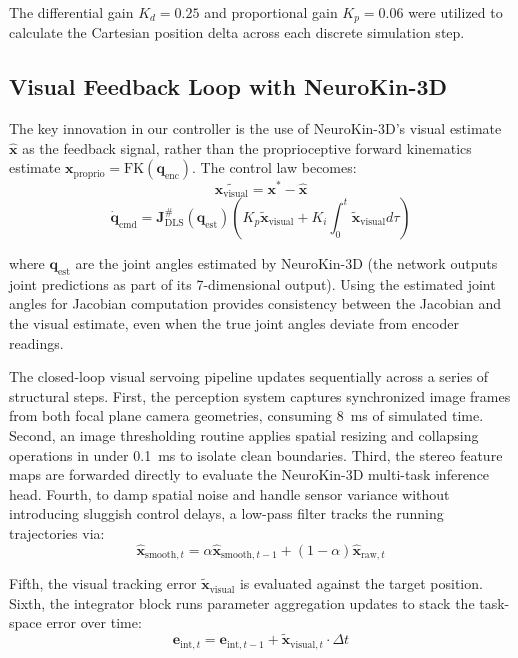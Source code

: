 \documentclass[12pt,a4paper,oneside]{report}
\begin{document}
The differential gain $K_d = 0.25$ and proportional gain $K_p = 0.06$ were utilized to calculate the Cartesian position delta across each discrete simulation step.
\subsection{Visual Feedback Loop with NeuroKin-3D}
\label{subsec:visual_feedback_loop_with_neurokin_3d}

The key innovation in our controller is the use of NeuroKin-3D's visual estimate $\hat{\mathbf{x}}$ as the feedback signal, rather than the proprioceptive forward kinematics estimate $\mathbf{x}_{\text{proprio}} = \text{FK}(\mathbf{q}_{\text{enc}})$. The control law becomes:
\begin{equation}\tilde{\mathbf{x}_{\text{visual}}} = \mathbf{x}^* - \hat{\mathbf{x}}
\end{equation}
\begin{equation}\dot{\mathbf{q}}_{\text{cmd}} = \mathbf{J}^{\#}_{\text{DLS}}(\mathbf{q}_{\text{est}}) \left( K_p \tilde{\mathbf{x}}_{\text{visual}} + K_i \int_0^t \tilde{\mathbf{x}}_{\text{visual}} d\tau \right)
\end{equation}

where $\mathbf{q}_{\text{est}}$ are the joint angles estimated by NeuroKin-3D (the network outputs joint predictions as part of its 7-dimensional output). Using the estimated joint angles for Jacobian computation provides consistency between the Jacobian and the visual estimate, even when the true joint angles deviate from encoder readings.

The closed-loop visual servoing pipeline updates sequentially across a series of structural steps. First, the perception system captures synchronized image frames from both focal plane camera geometries, consuming 8~ms of simulated time. Second, an image thresholding routine applies spatial resizing and collapsing operations in under 0.1~ms to isolate clean boundaries. Third, the stereo feature maps are forwarded directly to evaluate the NeuroKin-3D multi-task inference head. Fourth, to damp spatial noise and handle sensor variance without introducing sluggish control delays, a low-pass filter tracks the running trajectories via:
\begin{equation}\hat{\mathbf{x}}_{\text{smooth}, t} = \alpha \hat{\mathbf{x}}_{\text{smooth}, t-1} + (1 - \alpha) \hat{\mathbf{x}}_{\text{raw}, t}
\end{equation}

Fifth, the visual tracking error $\tilde{\mathbf{x}}_{\text{visual}}$ is evaluated against the target position. Sixth, the integrator block runs parameter aggregation updates to stack the task-space error over time:
\begin{equation}\mathbf{e}_{\text{int}, t} = \mathbf{e}_{\text{int}, t-1} + \tilde{\mathbf{x}}_{\text{visual}, t} \cdot \Delta t
\end{equation}
\end{document}
